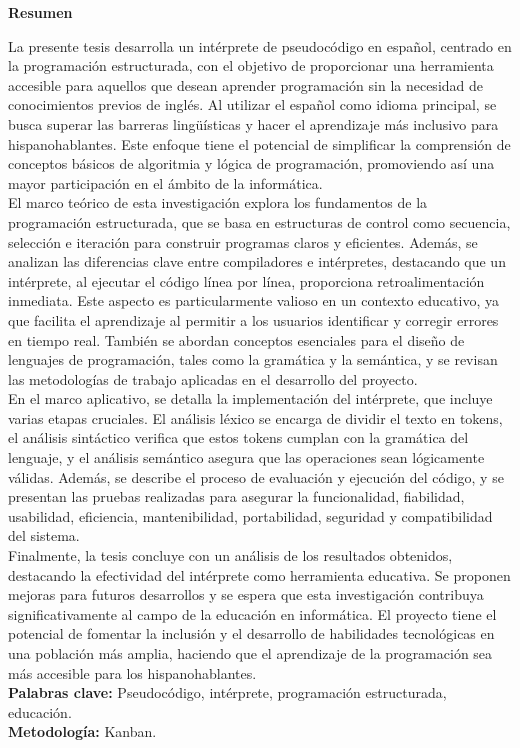 \begin{spacing}{1.5}
  \begin{center}
    \Large \textbf{Resumen}
  \end{center}
  La presente tesis desarrolla un intérprete de pseudocódigo en español, centrado en la programación estructurada, con el objetivo de proporcionar una herramienta accesible para aquellos que desean aprender programación sin la necesidad de conocimientos previos de inglés. Al utilizar el español como idioma principal, se busca superar las barreras lingüísticas y hacer el aprendizaje más inclusivo para hispanohablantes. Este enfoque tiene el potencial de simplificar la comprensión de conceptos básicos de algoritmia y lógica de programación, promoviendo así una mayor participación en el ámbito de la informática. \\
  El marco teórico de esta investigación explora los fundamentos de la programación estructurada, que se basa en estructuras de control como secuencia, selección e iteración para construir programas claros y eficientes. Además, se analizan las diferencias clave entre compiladores e intérpretes, destacando que un intérprete, al ejecutar el código línea por línea, proporciona retroalimentación inmediata. Este aspecto es particularmente valioso en un contexto educativo, ya que facilita el aprendizaje al permitir a los usuarios identificar y corregir errores en tiempo real. También se abordan conceptos esenciales para el diseño de lenguajes de programación, tales como la gramática y la semántica, y se revisan las metodologías de trabajo aplicadas en el desarrollo del proyecto. \\
  En el marco aplicativo, se detalla la implementación del intérprete, que incluye varias etapas cruciales. El análisis léxico se encarga de dividir el texto en tokens, el análisis sintáctico verifica que estos tokens cumplan con la gramática del lenguaje, y el análisis semántico asegura que las operaciones sean lógicamente válidas. Además, se describe el proceso de evaluación y ejecución del código, y se presentan las pruebas realizadas para asegurar la funcionalidad, fiabilidad, usabilidad, eficiencia, mantenibilidad, portabilidad, seguridad y compatibilidad del sistema. \\
  Finalmente, la tesis concluye con un análisis de los resultados obtenidos, destacando la efectividad del intérprete como herramienta educativa. Se proponen mejoras para futuros desarrollos y se espera que esta investigación contribuya significativamente al campo de la educación en informática. El proyecto tiene el potencial de fomentar la inclusión y el desarrollo de habilidades tecnológicas en una población más amplia, haciendo que el aprendizaje de la programación sea más accesible para los hispanohablantes. \\
  \textbf{Palabras clave:} Pseudocódigo, intérprete, programación estructurada, educación. \\
  \textbf{Metodología:} Kanban.
\end{spacing}
